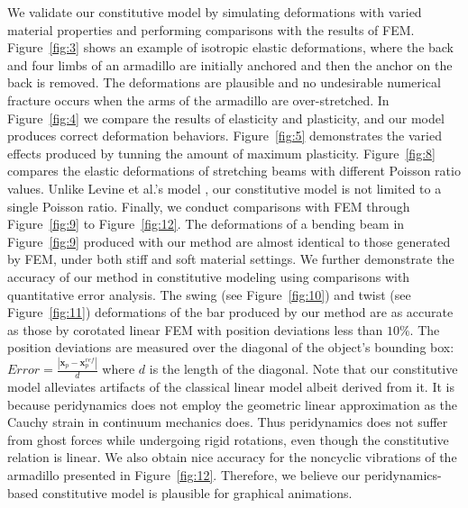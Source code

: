  We validate our constitutive model by simulating deformations with varied material properties and performing comparisons with the results of FEM. Figure~\ref{fig:3} shows an example of isotropic elastic deformations, where the back and four limbs of an armadillo are initially anchored and then the anchor on the back is removed. The deformations are plausible and no undesirable numerical fracture occurs when the arms of the armadillo are over-stretched. In Figure~\ref{fig:4} we compare the results of elasticity and plasticity, and our model produces correct deformation behaviors. Figure~\ref{fig:5} demonstrates the varied effects produced by tunning the amount of maximum plasticity. Figure~\ref{fig:8} compares the elastic deformations of stretching beams with different Poisson ratio values. Unlike Levine et al.'s model \cite{Levine:2015:PPS:2849517.2849526}, our constitutive model is not limited to a single Poisson ratio. Finally, we conduct comparisons with FEM through Figure~\ref{fig:9} to Figure~\ref{fig:12}.
The deformations of a bending beam in Figure~\ref{fig:9} produced with our method are almost identical to those generated by FEM, under both stiff and soft material settings. We further demonstrate the accuracy of our method in constitutive modeling using comparisons with quantitative error analysis. The swing (see Figure~\ref{fig:10}) and twist (see Figure~\ref{fig:11}) deformations of the bar produced by our method are as accurate as those by corotated linear FEM with position deviations less than $10\%$. The position deviations are measured over the diagonal of the object's bounding box: $Error = \frac{|\bm{x}_p-\bm{x}_p^{ref}|}{d}$ where $d$ is the length of the diagonal. Note that our constitutive model alleviates artifacts of the classical linear model albeit derived from it. It is because peridynamics does not employ the geometric linear approximation as the Cauchy strain in continuum mechanics does. Thus peridynamics does not suffer from ghost forces while undergoing rigid rotations, even though the constitutive relation is linear. We also obtain nice accuracy for the noncyclic vibrations of the armadillo presented in Figure~\ref{fig:12}. Therefore, we believe our peridynamics-based constitutive model is plausible for graphical animations.

